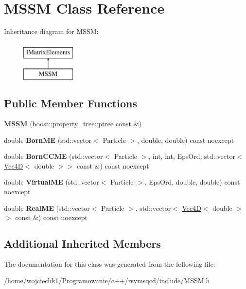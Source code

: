\hypertarget{classMSSM}{}\section{M\+S\+SM Class Reference}
\label{classMSSM}
Inheritance diagram for M\+S\+SM\+:\begin{figure}[H]
\begin{center}
\leavevmode
\includegraphics[height=2.000000cm]{classMSSM}
\end{center}
\end{figure}
\subsection*{Public Member Functions}
\begin{DoxyCompactItemize}
\item 
\mbox{\label{classMSSM_a37c98e03fcb404dc5b5b9ed7b6672659}} 
{\bfseries M\+S\+SM} (boost\+::property\+\_\+tree\+::ptree const \&)
\item 
\mbox{\label{classMSSM_a36406c9e5fadfa972f1cea93e1ad27c2}} 
double {\bfseries Born\+ME} (std\+::vector$<$ Particle $>$, double, double) const noexcept
\item 
\mbox{\label{classMSSM_ac3ae0219b18c5e588ef94fbc6ace4c5e}} 
double {\bfseries Born\+C\+C\+ME} (std\+::vector$<$ Particle $>$, int, int, Eps\+Ord, std\+::vector$<$ \hyperlink{classVec4D}{Vec4D}$<$ double $>$$>$ const \&) const noexcept
\item 
\mbox{\label{classMSSM_a05c93f6672f90df48f2af8a2f5261950}} 
double {\bfseries Virtual\+ME} (std\+::vector$<$ Particle $>$, Eps\+Ord, double, double) const noexcept
\item 
\mbox{\label{classMSSM_a94cbeecf337257efe49db8a4407559d0}} 
double {\bfseries Real\+ME} (std\+::vector$<$ Particle $>$, std\+::vector$<$ \hyperlink{classVec4D}{Vec4D}$<$ double $>$$>$ const \&) const noexcept
\end{DoxyCompactItemize}
\subsection*{Additional Inherited Members}


The documentation for this class was generated from the following file\+:\begin{DoxyCompactItemize}
\item 
/home/wojciechk1/\+Programowanie/c++/rsymsqcd/include/M\+S\+S\+M.\+h\end{DoxyCompactItemize}
